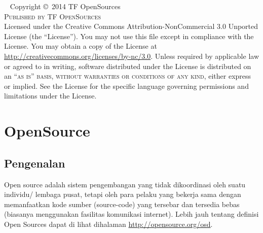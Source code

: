 \documentclass[11pt,fleqn]{book} %
\begin{document}
\newpage
~\vfill
\thispagestyle{empty}
\noindent Copyright \copyright\ 2014 TF OpenSources\\ %
\noindent \textsc{Published by TF OpenSources}\\ %
\noindent Licensed under the Creative Commons Attribution-NonCommercial 3.0 Unported License (the ``License''). You may not use this file except in compliance with the License. You may obtain a copy of the License at \url{http://creativecommons.org/licenses/by-nc/3.0}. Unless required by applicable law or agreed to in writing, software distributed under the License is distributed on an \textsc{``as is'' basis, without warranties or conditions of any kind}, either express or implied. See the License for the specific language governing permissions and limitations under the License.\\ %

\newpage
{} %
\pagestyle{empty} %
\tableofcontents %
\cleardoublepage %
\pagestyle{fancy} %

\newpage
{} %
\chapter{OpenSource}
\section{Pengenalan}
\begin{flushleft}
 \hspace{10pt} Open source adalah sistem pengembangan yang tidak dikoordinasi oleh suatu individu/ lembaga pusat, tetapi oleh para pelaku yang bekerja sama dengan memanfaatkan kode sumber (source-code) yang tersebar dan tersedia bebas (biasanya menggunakan fasilitas komunikasi internet). 
 Lebih jauh tentang definisi Open Sources dapat di lihat dihalaman \url{http://opensource.org/osd}.
\end{flushleft}
\end{document}
